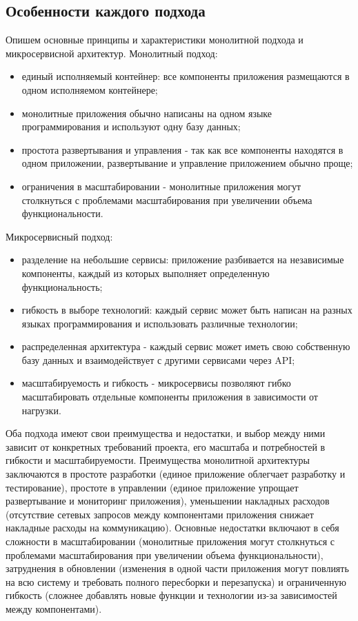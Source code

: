\subsection{Особенности каждого подхода}
    Опишем основные принципы и характеристики монолитной подхода и микросервисной архитектур.
    Монолитный подход:
    \begin{itemize}
        \item единый исполняемый контейнер: все компоненты приложения размещаются в одном исполняемом контейнере;
        \item монолитные приложения обычно написаны на одном языке программирования и используют одну базу данных;
        \item простота развертывания и управления - так как все компоненты находятся в одном приложении, развертывание и управление приложением обычно проще;
        \item ограничения в масштабировании - монолитные приложения могут столкнуться с проблемами масштабирования при увеличении объема функциональности.
    \end{itemize}

    Микросервисный подход:
     \begin{itemize}
        \item разделение на небольшие сервисы: приложение разбивается на независимые компоненты, каждый из которых выполняет определенную функциональность;
        \item гибкость в выборе технологий: каждый сервис может быть написан на разных языках программирования и использовать различные технологии;
        \item распределенная архитектура - каждый сервис может иметь свою собственную базу данных и взаимодействует с другими сервисами через API;
        \item масштабируемость и гибкость - микросервисы позволяют гибко масштабировать отдельные компоненты приложения в зависимости от нагрузки.
    \end{itemize}

    Оба подхода имеют свои преимущества и недостатки, и выбор между ними зависит от конкретных требований проекта, его масштаба и потребностей в гибкости и масштабируемости. Преимущества монолитной архитектуры заключаются в простоте разработки (единое приложение облегчает разработку и тестирование), простоте в управлении (единое приложение упрощает развертывание и мониторинг приложения), уменьшении накладных расходов (отсутствие сетевых запросов между компонентами приложения снижает накладные расходы на коммуникацию). Основные недостатки включают в себя сложности в масштабировании (монолитные приложения могут столкнуться с проблемами масштабирования при увеличении объема функциональности), затруднения в обновлении (изменения в одной части приложения могут повлиять на всю систему и требовать полного пересборки и перезапуска) и ограниченную гибкость (сложнее добавлять новые функции и технологии из-за зависимостей между компонентами).
    
